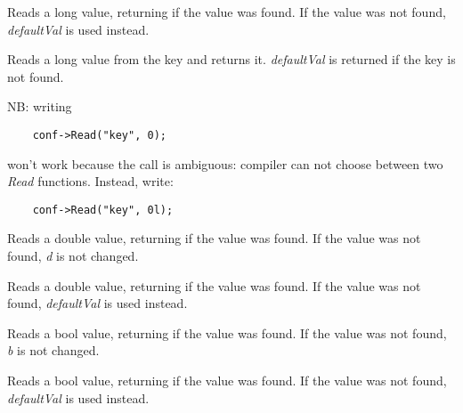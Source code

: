 Reads a long value, returning \true if the value was found. If the value was
not found, {\it defaultVal} is used instead.


Reads a long value from the key and returns it. {\it defaultVal} is returned
if the key is not found.

NB: writing

{\small
\begin{verbatim}
    conf->Read("key", 0);
\end{verbatim}
}

won't work because the call is ambiguous: compiler can not choose between two
{\it Read} functions. Instead, write:

{\small
\begin{verbatim}
    conf->Read("key", 0l);
\end{verbatim}
}


Reads a double value, returning \true if the value was found. If the value was
not found, {\it d} is not changed.


Reads a double value, returning \true if the value was found. If the value was
not found, {\it defaultVal} is used instead.


Reads a bool value, returning \true if the value was found. If the value was
not found, {\it b} is not changed.


Reads a bool value, returning \true if the value was found. If the value was
not found, {\it defaultVal} is used instead.



